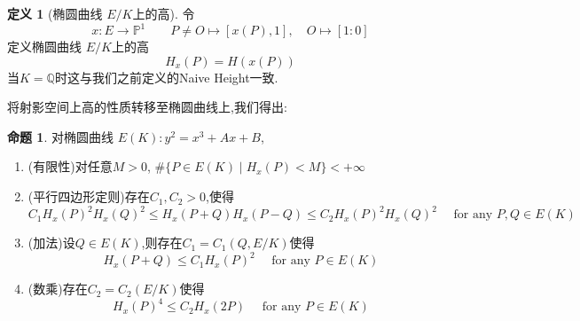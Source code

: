 \documentclass[12pt,A4paper,oneside,reqno]{amsart}
\numberwithin{equation}{section}
\theoremstyle{definition}
\newtheorem{proposition}[theorem]{命题}
\newtheorem{defn}[theorem]{定义}
\theoremstyle{plain}
\theoremstyle{plain}
\numberwithin{equation}{section}
\theoremstyle{remark}
\begin{document}
\begin{defn}[椭圆曲线 $E/K$上的高]
	令$$x:E\longrightarrow \mathbb{P}^1 \qquad P\neq O \longmapsto [x(P),1], \quad O \longmapsto [1:0]$$
	定义椭圆曲线 $E/K$上的高
	$$H_x(P)=H(x(P))$$
	当$K=\mathbb{Q}$时这与我们之前定义的Naive Height一致.
\end{defn}
将射影空间上高的性质转移至椭圆曲线上,我们得出:
\begin{proposition}
	对椭圆曲线 $E(K)\colon y^2=x^3+Ax+B$,
	\begin{enumerate}[1.]
		\item\label{item:finiteness} (有限性)对任意$M>0$, $\#\{P \in E(K)\mid H_x(P)<M \} < + \infty$
		\item\label{item:parel} (平行四边形定则)存在$C_1,C_2>0$,使得
		$$C_1H_x(P)^2H_x(Q)^2 \leqslant H_x(P+Q)H_x(P-Q) \leqslant C_2H_x(P)^2H_x(Q)^2 \quad\text{ for any }P,Q \in E(K)$$
		\item\label{item:add} (加法)设$Q \in E(K)$,则存在$C_1=C_1(Q,E/K)$使得
		$$H_x(P+Q) \leqslant C_1H_x(P)^2 \quad\text{ for any }P \in E(K)$$
		\item\label{item:mult} (数乘)存在$C_2=C_2(E/K)$使得
		$$H_x(P)^4 \leqslant C_2H_x(2P) \quad\text{ for any }P \in E(K)$$
	\end{enumerate}
\end{proposition}
\end{document}
